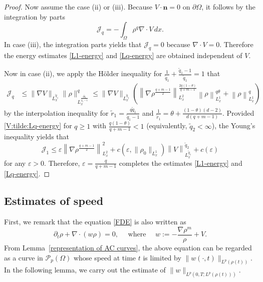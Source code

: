 \documentclass{amsart}
\numberwithin{equation}{section}
\begin{document}
\begin{proof}
	
	Now assume the case (ii) or (iii). Because $V\cdot \textbf{n}=0$ on $\partial{\Omega}$, it follows by the integration by parts
	\[
	\mathcal{J}_{q} = - \int_{\Omega} \rho^q \nabla \cdot V \,dx.
	\]
	In case (iii), the integration parts yields that $\mathcal{J}_{q} = 0$ because $\nabla \cdot V = 0$. Therefore the energy estimates \eqref{L1-energy} and \eqref{Lq-energy} are obtained independent of $V$. 
	

	Now in case (ii), we apply the H\"{o}lder inequality for $\frac{1}{\tilde{q}_1} + \frac{\tilde{q}_1 - 1}{\tilde{q}_1}=1$ that 
	\[\begin{aligned}
		\mathcal{J}_{q} &\leq \|\nabla V\|_{L_{x}^{\tilde{q}_1}} \|\rho\|_{L^{\frac{q \tilde{q}_1}{\tilde{q}_1 - 1}}_{x}}^{q} 
		\leq \|\nabla V\|_{L_{x}^{\tilde{q}_1}} \left( \left\| \nabla \rho^{\frac{q+m-1}{2}}\right\|_{L^2_x}^{\frac{2q(1-\theta)}{q+m-1}} \left\|\rho\right\|_{L^{1}_{x}}^{q\theta} + \left\|\rho\right\|_{L^{1}_{x}}^{q}\right)
	\end{aligned}\] 
	by the interpolation inequality for $\tilde{r}_1 = \frac{q\tilde{q}_1}{\tilde{q}_1 -1}$ and $\frac{1}{\tilde{r}_1} = \theta + \frac{(1-\theta)(d-2)}{d(q+m-1)}$.
	Provided \eqref{V:tilde:Lq-energy} for $q\geq 1$ with $\frac{q(1-\theta)}{q+m-1} < 1$ (equivalently, $\tilde{q}_2 < \infty$), the Young's inequality yields that 
	\[
	\mathcal{J}_1 \leq \varepsilon \left\| \nabla \rho^{\frac{q+m-1}{2}}\right\|_{L^2_x}^{2} + c(\varepsilon, \|\rho_0\|_{L_{x}^1}) \left\|V\right\|_{L^{\tilde{q}_1}_{x}}^{\tilde{q}_2} + c(\varepsilon) 
	\]
	for any $\varepsilon>0$. Therefore, $\varepsilon = \frac{q}{q+m-1}$ completes the estimates \eqref{L1-energy} and \eqref{Lq-energy}.
\end{proof}




\subsection{Estimates of speed}\label{SS:speed}
 
First, we remark that the equation \eqref{FDE} is also written as 
\[
\partial_t \rho + \nabla \cdot (w \rho)=0, \quad \text{ where } \quad w:= - \frac{\nabla \rho^m}{\rho} + V. 
\]
From Lemma~\ref{representation of AC curves}, the above equation can be regarded as a curve in $\mathcal{P}_{p}(\Omega)$ whose speed at time $t$ is limited by $\|w(\cdot, t)\|_{L^{p}(\rho(t))}$. In the following lemma, we carry out the estimate of $\|w\|_{L^{p}(0,T; L^p(\rho(t)))}$. 
\end{document}
